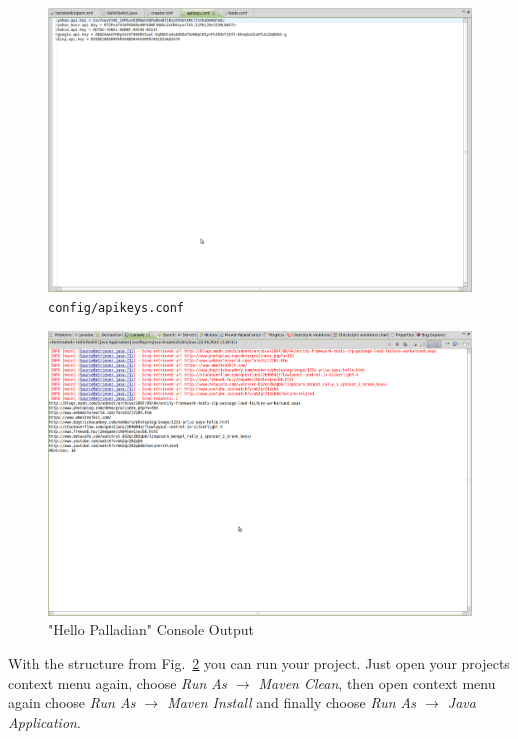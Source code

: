 \begin{figure}
\centering
\includegraphics[trim=0 850px 600px 0,clip=true,width=\textwidth]{img/ht12.png}
\caption{\texttt{config/apikeys.conf}}
\label{fig:resource02}
\end{figure}
\begin{figure}
\centering
\includegraphics[trim=0 550px 100px 0,clip=true,width=\textwidth]{img/ht14.png}
\caption{"Hello Palladian" Console Output}
\label{fig:structure}
\end{figure}
With the structure from Fig.~\ref{fig:structure} you can run your project. Just open your projects context menu again, choose \textit{Run As $\rightarrow$ Maven Clean}, then open context menu again choose \textit{Run As $\rightarrow$ Maven Install} and finally choose \textit{Run As $\rightarrow$ Java Application}.

